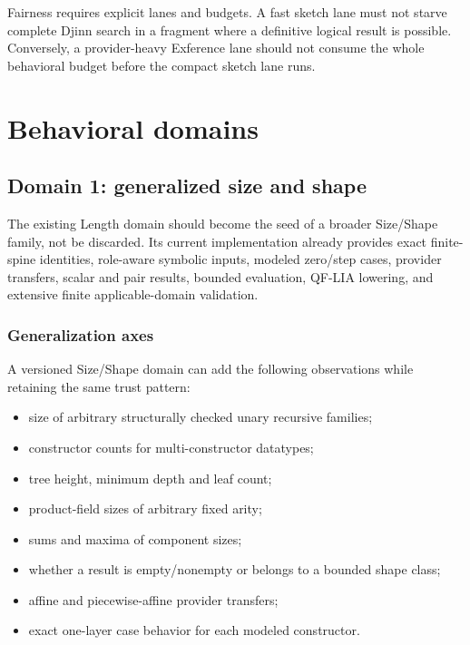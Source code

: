\documentclass[11pt,oneside]{report}
\begin{document}
Fairness requires explicit lanes and budgets. A fast sketch lane must not starve complete Djinn search in a fragment where a definitive logical result is possible. Conversely, a provider-heavy Exference lane should not consume the whole behavioral budget before the compact sketch lane runs.


\chapter{Behavioral domains}
\label{chap:domains}

\section{Domain 1: generalized size and shape}
\label{sec:domain-size-shape}

The existing Length domain should become the seed of a broader Size/Shape family, not be discarded. Its current implementation already provides exact finite-spine identities, role-aware symbolic inputs, modeled zero/step cases, provider transfers, scalar and pair results, bounded evaluation, QF-LIA lowering, and extensive finite applicable-domain validation.

\subsection{Generalization axes}

A versioned Size/Shape domain can add the following observations while retaining the same trust pattern:

\begin{itemize}[leftmargin=2em]
\item size of arbitrary structurally checked unary recursive families;
\item constructor counts for multi-constructor datatypes;
\item tree height, minimum depth and leaf count;
\item product-field sizes of arbitrary fixed arity;
\item sums and maxima of component sizes;
\item whether a result is empty/nonempty or belongs to a bounded shape class;
\item affine and piecewise-affine provider transfers;
\item exact one-layer case behavior for each modeled constructor.
\end{itemize}
\end{document}
